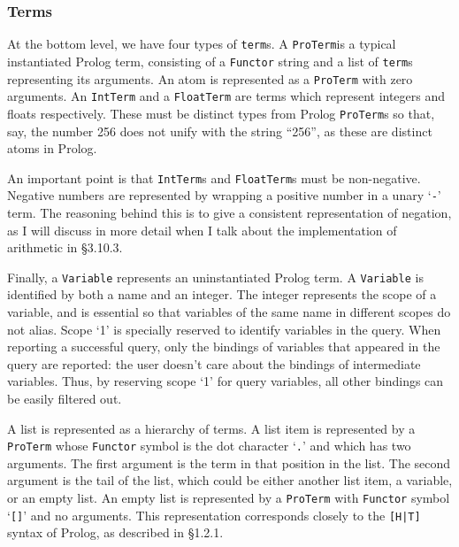 \documentclass[12pt]{article}
\begin{document}
\subsubsection{Terms}

At the bottom level, we have four types of \verb|term|s. 
A \verb|ProTerm|\footnotemark[1] is a typical instantiated Prolog term, consisting of a \verb|Functor| string and a list of \verb|term|s representing its arguments. 
An atom is represented as a \verb|ProTerm| with zero arguments.
An \verb|IntTerm| and a \verb|FloatTerm| are terms which represent integers and floats respectively. 
These must be distinct types from Prolog \verb|ProTerm|s so that, say, the number 256 does not unify with the string ``256'', as these are distinct atoms in Prolog.


An important point is that \verb|IntTerm|s and \verb|FloatTerm|s must be non-negative. 
Negative numbers are represented by wrapping a positive number in a unary `\verb|-|' term. 
The reasoning behind this is to give a consistent representation of negation, as I will discuss in more detail when I talk about the implementation of arithmetic in \S3.10.3.

Finally, a \verb|Variable| represents an uninstantiated Prolog term. 
A \verb|Variable| is identified by both a name and an integer. 
The integer represents the scope of a variable, and is essential so that variables of the same name in different scopes do not alias. 
Scope `1' is specially reserved to identify variables in the query. 
When reporting a successful query, only the bindings of variables that appeared in the query are reported: the user doesn't care about the bindings of intermediate variables.
Thus, by reserving scope `1' for query variables, all other bindings can be easily filtered out.

A list is represented as a hierarchy of terms. 
A list item is represented by a \verb|ProTerm| whose \verb|Functor| symbol is the dot character `\verb|.|' and which has two arguments. 
The first argument is the term in that position in the list. 
The second argument is the tail of the list, which could be either another list item, a variable, or an empty list.
An empty list is represented by a \verb|ProTerm| with \verb|Functor| symbol `\verb|[]|' and no arguments. 
This representation corresponds closely to the \verb/[H|T]/ syntax of Prolog, as described in \S1.2.1.
\end{document}
